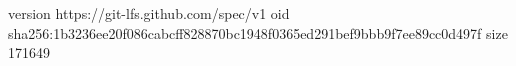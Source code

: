 version https://git-lfs.github.com/spec/v1
oid sha256:1b3236ee20f086cabcff828870bc1948f0365ed291bef9bbb9f7ee89cc0d497f
size 171649
